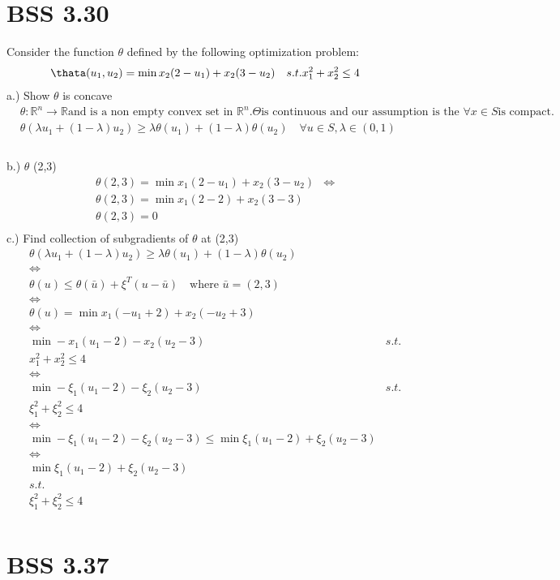 \documentclass[12pt]{article}
\newcommand{\R}{\mathbb{R}}
\begin{document}
\section{BSS 3.30}
Consider the function $\theta$ defined by the following optimization problem: 
    \begin{align*}
        &\thata (u_1, u_2) = \min x_2(2-u_1) + x_2 (3-u_2)
        &s.t.
        &x_1^2 + x_2^2 \leq 4
    \end{align*}
a.) Show $\theta$ is concave
    \begin{align*}
        &\theta:\R^n \longrightarrow \R \text{and is a non empty convex set in } \R^n. \Theta \text{is continuous and our assumption is the } \forall x \in S \text{is compact.}\\ 
        &\theta (\lambda u_1 + (1-\lambda) u_2) \geq \lambda \theta(u_1) + (1-\lambda) \theta(u_2) \quad \forall u \in S, \lambda \in (0,1)\\
    \end{align*}\\
b.) $\theta$ (2,3)\\
    \begin{align*}
        &\theta (2,3) = \min x_1(2-u_1) + x_2 (3 - u_2) 
        &\Leftrightarrow\\
        &\theta (2,3) = \min x_1(2-2) + x_2 (3 - 3)\\
        &\theta (2,3) = 0 \\
    \end{align*}
c.) Find collection of subgradients of $\theta$ at (2,3)\\ 
    \begin{align*}
         &\theta (\lambda u_1 + (1-\lambda) u_2) \geq \lambda \theta(u_1) + (1-\lambda) \theta(u_2) \\ 
         &\Leftrightarrow\\
         &\theta (u) \leq \theta (\bar u) + \xi^T (u -\bar u) \quad \text{where } \bar u = (2,3)\\
         &\Leftrightarrow\\
         &\theta(u) = \min x_1 (-u_1 +2) + x_2 (-u_2 + 3) \\ 
         &\Leftrightarrow\\
         & \min -x_1(u_1 -2) -x_2 (u_2 -3) 
         &s.t.\\
         &x_1^2 + x_2^2 \leq 4\\
         &\Leftrightarrow\\
         & \min -\xi_1(u_1 -2) -\xi_2 (u_2 -3) 
         &s.t.\\
         &\xi_1^2 + \xi_2^2 \leq 4\\
         &\Leftrightarrow\\
         & \min -\xi_1(u_1 -2) -\xi_2 (u_2 -3) \leq \min \xi_1(u_1 -2) + \xi_2 (u_2 -3)\\
         &\Leftrightarrow\\
         &\min \xi_1(u_1 -2) + \xi_2 (u_2 -3)\\
         &s.t.\\
         &\xi_1^2 + \xi_2^2 \leq 4\\
    \end{align*}
\section{BSS 3.37}
\end{document}
